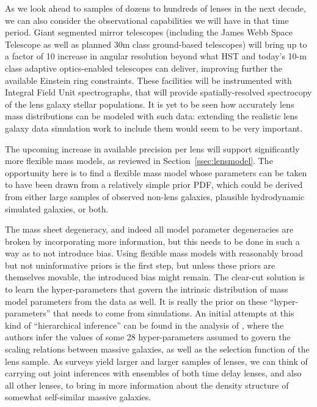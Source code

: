 As we look ahead to samples of dozens to hundreds of lenses in the
next decade, we can also consider the observational capabilities we
will have in that time period. Giant segmented mirror telescopes
(including the James Webb Space Telescope as well as planned 30m class
ground-based telescopes) will bring up to a factor of 10 increase in
angular resolution beyond what HST and today's 10-m class adaptive
optics-enabled telescopes can deliver, improving further the available
Einstein ring constraints. These facilities will be instrumented with
Integral Field Unit spectrographs, that will provide
spatially-resolved spectrocopy of the lens galaxy stellar populations.
It is yet to be seen how accurately lens mass distributions can be
modeled with such data: extending the realistic lens galaxy data
simulation work to include them would seem to be very important.

The upcoming increase in available precision per lens will support
significantly more flexible mass models, as reviewed in
Section~\ref{ssec:lensmodel}.
The opportunity here is to find a flexible mass model whose parameters
can be taken to have been drawn from a relatively simple prior PDF,
which could be derived from either large samples of observed non-lens
galaxies, plausible hydrodynamic simulated galaxies, or both.


The mass sheet degeneracy, and indeed all model parameter degeneracies
are broken by incorporating more information, but this needs to be
done in such a way as to not introduce bias. Using flexible mass
models with reasonably broad but not uninformative priors is the first
step, but unless these priors are themselves movable, the introduced
bias might remain. The clear-cut solution is to learn the
hyper-parameters that govern the intrinsic distribution of mass model
parameters from the data as well. It is really the prior on these
``hyper-parameters'' that needs to come from simulations. An initial
attempts at this kind of ``hierarchical inference'' can be found in
the analysis of \citet{SonnenfeldEtal2015}, where the authors infer
the values of some 28 hyper-parameters assumed to govern the scaling
relations between massive galaxies, as well as the selection function
of the lens sample. As surveys yield larger and larger samples of
lenses, we can think of carrying out joint inferences with ensembles
of both time delay lenses, and also all other lenses, to bring in more
information about the density structure of somewhat self-similar
massive galaxies.



